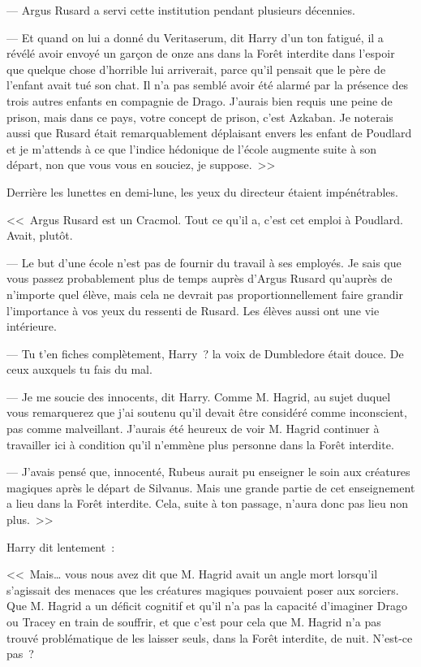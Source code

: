 --- Argus Rusard a servi cette institution pendant plusieurs décennies.

--- Et quand on lui a donné du Veritaserum, dit Harry d'un ton fatigué, il a révélé avoir envoyé un garçon de onze ans dans la Forêt interdite dans l'espoir que quelque chose d'horrible lui arriverait, parce qu'il pensait que le père de l'enfant avait tué son chat. Il n'a pas semblé avoir été alarmé par la présence des trois autres enfants en compagnie de Drago. J'aurais bien requis une peine de prison, mais dans ce pays, votre concept de prison, c'est Azkaban. Je noterais aussi que Rusard était remarquablement déplaisant envers les enfant de Poudlard et je m'attends à ce que l'indice hédonique de l'école augmente suite à son départ, non que vous vous en souciez, je suppose.~>>

Derrière les lunettes en demi-lune, les yeux du directeur étaient impénétrables.

<<~Argus Rusard est un Cracmol. Tout ce qu'il a, c'est cet emploi à Poudlard. Avait, plutôt.

--- Le but d'une école n'est pas de fournir du travail à ses employés. Je sais que vous passez probablement plus de temps auprès d'Argus Rusard qu'auprès de n'importe quel élève, mais cela ne devrait pas proportionnellement faire grandir l'importance à vos yeux du ressenti de Rusard. Les élèves aussi ont une vie intérieure.

--- Tu t'en fiches complètement, Harry~? la voix de Dumbledore était douce. De ceux auxquels tu fais du mal.

--- Je me soucie des innocents, dit Harry. Comme M. Hagrid, au sujet duquel vous remarquerez que j'ai soutenu qu'il devait être considéré comme inconscient, pas comme malveillant. J'aurais été heureux de voir M. Hagrid continuer à travailler ici à condition qu'il n'emmène plus personne dans la Forêt interdite.

--- J'avais pensé que, innocenté, Rubeus aurait pu enseigner le soin aux créatures magiques après le départ de Silvanus. Mais une grande partie de cet enseignement a lieu dans la Forêt interdite. Cela, suite à ton passage, n'aura donc pas lieu non plus.~>>

Harry dit lentement~:

<<~Mais… vous nous avez dit que M. Hagrid avait un angle mort lorsqu'il s'agissait des menaces que les créatures magiques pouvaient poser aux sorciers. Que M. Hagrid a un déficit cognitif et qu'il n'a pas la capacité d'imaginer Drago ou Tracey en train de souffrir, et que c'est pour cela que M. Hagrid n'a pas trouvé problématique de les laisser seuls, dans la Forêt interdite, de nuit. N'est-ce pas~?

